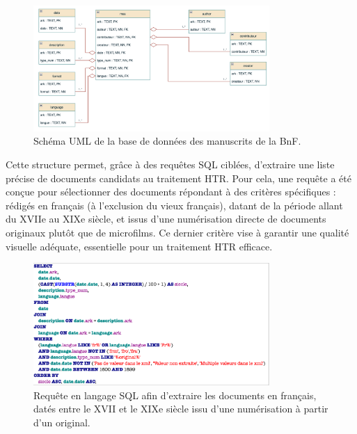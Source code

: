 \documentclass[a4paper,12pt,twoside]{book}
\begin{document}
	\begin{figure}[h!]
		\centering
		\includegraphics[width=0.8\textwidth]{images/schema_uml_db_mss_bnf.png}
		\caption{Schéma UML de la base de données des manuscrits de la BnF.}
		\label{fig:monimage}
	\end{figure}
	
	Cette structure permet, grâce à des requêtes SQL ciblées, d'extraire une liste précise de documents candidats au traitement HTR. Pour cela, une requête a été conçue pour sélectionner des documents répondant à des critères spécifiques : rédigés en français (à l'exclusion du vieux français), datant de la période allant du XVIIe au XIXe siècle, et issus d'une numérisation directe de documents originaux plutôt que de microfilms. Ce dernier critère vise à garantir une qualité visuelle adéquate, essentielle pour un traitement HTR efficace.  
	\\
	\begin{figure}[h!]
		\centering
		\includegraphics[width=0.8\textwidth]{images/requete_sql.png}
		\caption{Requête en langage SQL afin d’extraire les documents en français, datés entre le XVII et le XIXe siècle issu d’une numérisation à partir d’un original.}
		\label{fig:monimage}
	\end{figure}
	
\end{document}
